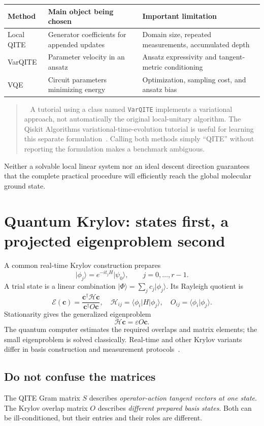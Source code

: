 \documentclass[11pt,a4paper]{article}
\newcommand{\ket}[1]{\lvert #1\rangle}
\newcommand{\bra}[1]{\langle #1\rvert}
\newcommand{\braket}[2]{\langle #1\vert #2\rangle}
\newcommand{\lesson}[2]{\clearpage\section{#1}\label{#2}}
\newenvironment{caution}[1][Important distinction]{\par\smallskip\begin{quotation}\noindent{\bfseries\textcolor{alertred}{#1.}}\ }{\end{quotation}\smallskip}
\begin{document}
\begin{tabularx}{\linewidth}{@{}p{2.4cm}X X@{}}
\toprule
Method & Main object being chosen & Important limitation\\\midrule
Local QITE & Generator coefficients for appended updates & Domain size, repeated measurements, accumulated depth\\
VarQITE & Parameter velocity in an ansatz & Ansatz expressivity and tangent-metric conditioning\\
VQE & Circuit parameters minimizing energy & Optimization, sampling cost, and ansatz bias\\\bottomrule
\end{tabularx}

\begin{caution}[Software names matter]
A tutorial using a class named \texttt{VarQITE} implements a variational approach, not automatically the original local-unitary algorithm. The Qiskit Algorithms variational-time-evolution tutorial is useful for learning this separate formulation~\cite{qiskitvar}. Calling both methods simply ``QITE'' without reporting the formulation makes a benchmark ambiguous.
\end{caution}

Neither a solvable local linear system nor an ideal descent direction guarantees that the complete practical procedure will efficiently reach the global molecular ground state.

\lesson{Quantum Krylov: states first, a projected eigenproblem second}{sec:krylov}
A common real-time Krylov construction prepares
\[
\ket{\phi_j}=e^{-it_jH}\ket{\psi_0},\qquad j=0,\ldots,r-1.
\]
A trial state is a linear combination $\ket{\Phi}=\sum_j c_j\ket{\phi_j}$. Its Rayleigh quotient is
\[
\mathcal E(\bm c)=\frac{\bm c^\dagger\mathcal H\bm c}{\bm c^\dagger O\bm c},\quad
\mathcal H_{ij}=\bra{\phi_i}H\ket{\phi_j},\quad
O_{ij}=\braket{\phi_i}{\phi_j}.
\]
Stationarity gives the generalized eigenproblem
\begin{equation}
\boxed{\mathcal H\bm c=\varepsilon O\bm c.}
\label{eq:krylov}
\end{equation}
The quantum computer estimates the required overlaps and matrix elements; the small eigenproblem is solved classically. Real-time and other Krylov variants differ in basis construction and measurement protocols~\cite{cortes}.

\subsection*{Do not confuse the matrices}
The QITE Gram matrix $S$ describes \emph{operator-action tangent vectors at one state}. The Krylov overlap matrix $O$ describes \emph{different prepared basis states}. Both can be ill-conditioned, but their entries and their roles are different.
\end{document}
